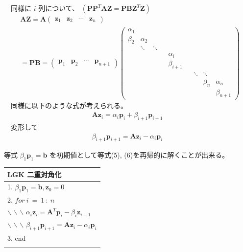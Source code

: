 \documentclass[a4paper,10pt]{jarticle}
\begin{document}
　同様に \(i\) 列について、 \((\bm{P}\bm{P}^T\bm{A}\bm{Z}=\bm{P}\bm{B}\bm{Z}^T\bm{Z})\)\\
\begin{align*}
&\bm{A}\bm{Z}
= \bm{A}
\begin{pmatrix}
\bm{z}_1 & \bm{z}_2 & \cdots & \bm{z}_n
\end{pmatrix} \\ 
&= \bm{P}\bm{B} = 
\begin{pmatrix}
\bm{p}_1 & \bm{p}_2 & \cdots & \bm{p}_{n+1}
\end{pmatrix}
\begin{pmatrix}
\alpha_1 &&&&&&& \\
\beta_2 & \alpha_2 &&&&&& \\
& \ddots & \ddots &&&&&\\
&&&& \alpha_i &&& \\
&&&& \beta_{i+1} &&& \\
&&&&&& \ddots & \ddots &\\
&&&&&&& \beta_n & \alpha_n \\
&&&&&&&& \beta_{n+1}
\end{pmatrix}
\end{align*}
　同様に以下のような式が考えられる。\\
\begin{align*}
\bm{A}\bm{z}_i = \alpha_i\bm{p}_i + \beta_{i+1}\bm{p}_{i+1}
\end{align*}
　変形して\\
\begin{align*}
\beta_{i+1}\bm{p}_{i+1}=\bm{A}\bm{z}_i -\alpha_i\bm{p}_i \tag{6}
\end{align*}

等式 \(\beta_1\bm{p}_1 = \bm{b}\) を初期値として等式(5), (6)を再帰的に解くことが出来る。\\

\begin{center}
\begin{tabular*}{\linewidth}{l}
\hline
\textbf{LGK 二重対角化}\\
\hline
1. \(\beta_1\bm{p}_1 = \bm{b}, \bm{z}_0 = 0\)\\
2. \(for\ i\ =\ 1\ :\ n\)\\
$\backslash$ $\backslash$ $\backslash$ \(\alpha_i\bm{z}_i = \bm{A}^T\bm{p}_i-\beta_i\bm{z}_{i-1}\)\\
$\backslash$ $\backslash$ $\backslash$ \(\beta_{i+1}\bm{p}_{i+1} = \bm{A}\bm{z}_i- \alpha_{i}\bm{p}_i\)\\
3. end\\
\\
\hline
\end{tabular*}
\end{center}
\end{document}
